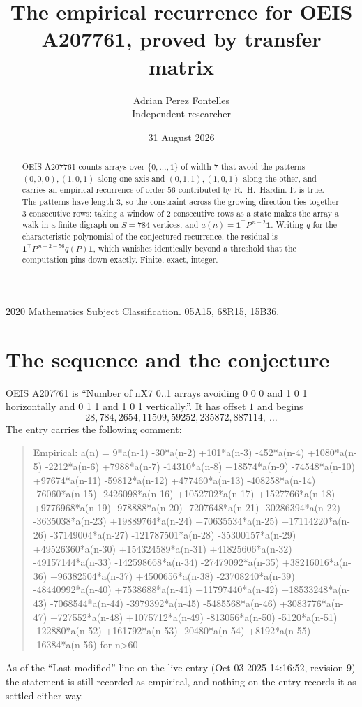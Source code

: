 \documentclass[11pt,a4paper]{article}
\title{The empirical recurrence for OEIS A207761, proved by transfer matrix}
\author{Adrian Perez Fontelles\\ \small Independent researcher}
\date{31 August 2026}
\theoremstyle{plain}
\theoremstyle{definition}
\begin{document}
\maketitle

\begin{abstract}
OEIS A207761 counts arrays over $\{0,\dots,1\}$ of width $7$ that avoid the patterns
$(0,0,0), (1,0,1)$ along one axis and $(0,1,1), (1,0,1)$ along the other, and carries an empirical recurrence of
order $56$ contributed by R.~H.~Hardin. It is true. The patterns have length $3$, so
the constraint across the growing direction ties together $3$ consecutive rows: taking a
window of $2$ consecutive rows as a state makes the array a walk in a finite digraph
on $S=784$ vertices, and $a(n)=\mathbf{1}^{\!\top}P^{\,n-2}\mathbf{1}$. Writing $q$
for the characteristic polynomial of the conjectured recurrence, the residual is
$\mathbf{1}^{\!\top}P^{\,n-2-56}q(P)\mathbf{1}$, which vanishes identically
beyond a threshold that the computation pins down exactly. Finite, exact, integer.
\end{abstract}

\noindent\small 2020 Mathematics Subject Classification. 05A15, 68R15, 15B36.\normalsize

\section{The sequence and the conjecture}

OEIS A207761 is ``Number of nX7 0..1 arrays avoiding 0 0 0 and 1 0 1 horizontally and 0 1 1 and 1 0 1 vertically.''. It has offset
$1$ and begins
\[
28, 784, 2654, 11509, 59252, 235872, 887114,\ \dots
\]
The entry carries the following comment:
\begin{quote}\small
Empirical: a(n) = 9*a(n-1) -30*a(n-2) +101*a(n-3) -452*a(n-4) +1080*a(n-5) -2212*a(n-6) +7988*a(n-7) -14310*a(n-8) +18574*a(n-9) -74548*a(n-10) +97674*a(n-11) -59812*a(n-12) +477460*a(n-13) -408258*a(n-14) -76060*a(n-15) -2426098*a(n-16) +1052702*a(n-17) +1527766*a(n-18) +9776968*a(n-19) -978888*a(n-20) -7207648*a(n-21) -30286394*a(n-22) -3635038*a(n-23) +19889764*a(n-24) +70635534*a(n-25) +17114220*a(n-26) -37149004*a(n-27) -121787501*a(n-28) -35300157*a(n-29) +49526360*a(n-30) +154324589*a(n-31) +41825606*a(n-32) -49157144*a(n-33) -142598668*a(n-34) -27479092*a(n-35) +38216016*a(n-36) +96382504*a(n-37) +4500656*a(n-38) -23708240*a(n-39) -48440992*a(n-40) +7538688*a(n-41) +11797440*a(n-42) +18533248*a(n-43) -7068544*a(n-44) -3979392*a(n-45) -5485568*a(n-46) +3083776*a(n-47) +727552*a(n-48) +1075712*a(n-49) -813056*a(n-50) -5120*a(n-51) -122880*a(n-52) +161792*a(n-53) -20480*a(n-54) +8192*a(n-55) -16384*a(n-56) for n>60
\end{quote}
As of the ``Last modified'' line on the live entry (Oct 03 2025 14:16:52, revision
9) the statement is still recorded as empirical, and nothing on the entry
records it as settled either way.
\end{document}
